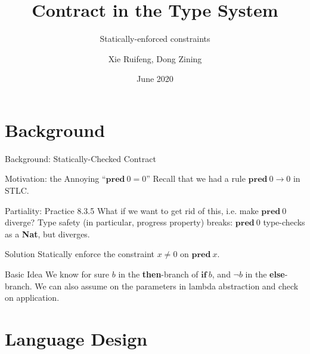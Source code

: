 \documentclass[handout]{beamer}
\title{Contract in the Type System}
\subtitle{Statically-enforced constraints}
\author{Xie Ruifeng, Dong Zining}
\institute{{School of EECS, Peking University}\\{https://github.com/Krantz-XRF/contract}}
\date{June 2020}
\begin{document}
\maketitle

\tableofcontents

\section{Background}

\begin{frame}{Background: Statically-Checked Contract}

\begin{block}{Motivation: the Annoying ``$\textbf{pred} \ 0 = 0$''}\vspace{0pt}
Recall that we had a rule $\textbf{pred} \ 0 \to 0$ in STLC.
\end{block}

\pause

\begin{block}{\alert{Partiality}: Practice 8.3.5}\vspace{0pt}
What if we want to get rid of this, i.e. make $\textbf{pred} \ 0$ diverge? \alert{Type safety} (in particular, progress property) breaks: $\textbf{pred} \ 0$ type-checks as a \textbf{Nat}, but diverges.
\end{block}

\pause

\begin{block}{Solution}\vspace{0pt}
Statically enforce the constraint $x \ne 0$ on $\textbf{pred} \ x$.
\end{block}

\pause

\begin{block}{Basic Idea}\vspace{0pt}
We know for sure \alert{$b$ in the \textbf{then}-branch of $\textbf{if} \ b$, and $\neg b$ in the \textbf{else}-branch}. We can also \alert{assume on the parameters} in lambda abstraction and \alert{check on application}.
\end{block}

\end{frame}

\section{Language Design}
\end{document}
